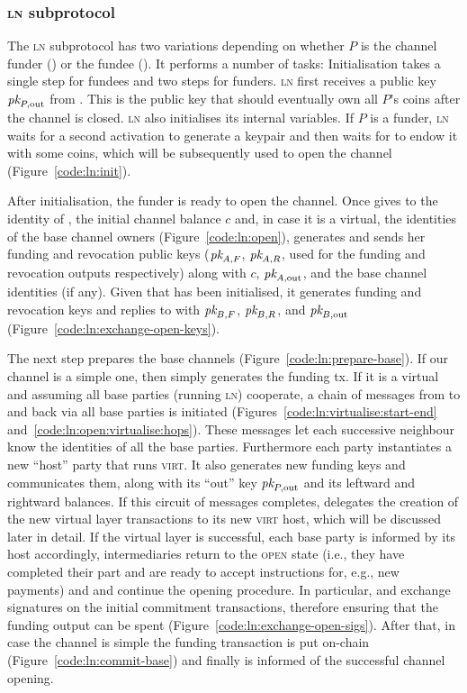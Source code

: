   \subsubsection{\textsc{ln} subprotocol}
  \label{construction:ln}
  The \textsc{ln} subprotocol has two variations depending on whether $P$ is the
  channel funder (\alice) or the fundee (\bob). It performs a number of tasks:
  Initialisation takes a single step for fundees and two steps for funders.
  \textsc{ln} first receives a public key $\textit{pk}_{P, \mathrm{out}}$ from
  \environment. This is the public key that should eventually own all $P$'s
  coins after the channel is closed. \textsc{ln} also initialises its internal
  variables. If $P$ is a funder, \textsc{ln} waits for a second activation to
  generate a keypair and then waits for \environment to endow it with some
  coins, which will be subsequently used to open the channel
  (Figure~\ref{code:ln:init}).

  After initialisation, the funder \alice is ready to open the channel. Once
  \environment gives to \alice the identity of \bob, the initial channel balance
  $c$ and,
  in case it is a virtual, the identities of the base channel owners
  (Figure~\ref{code:ln:open}), \alice generates and sends \bob her funding and
  revocation public keys ($\textit{pk}_{A, F}$, $\textit{pk}_{A, R}$, used for the funding and
  revocation outputs respectively) along with $c$, $\textit{pk}_{A,
  \mathrm{out}}$, and the base channel identities (if any). Given that \bob has
  been initialised, it generates funding and revocation keys and replies to
  \alice with $\textit{pk}_{B, F}$, $\textit{pk}_{B, R}$, and $\textit{pk}_{B, \mathrm{out}}$
  (Figure~\ref{code:ln:exchange-open-keys}).

  The next step prepares the base channels (Figure~\ref{code:ln:prepare-base}).
  If our channel is a simple one, then \alice simply generates the funding tx.
  If it is a virtual and assuming all base parties (running \textsc{ln})
  cooperate, a chain of messages from \alice to \bob and back via all base
  parties is initiated (Figures~\ref{code:ln:virtualise:start-end}
  and~\ref{code:ln:open:virtualise:hops}). These messages let each successive
  neighbour know the identities of all the base parties. Furthermore each party
  instantiates a new ``host'' party that runs \textsc{virt}. It also generates
  new funding keys and communicates them, along with its ``out'' key $\textit{pk}_{P,
  \mathrm{out}}$ and its
  leftward and rightward balances. If this circuit of messages completes, \alice
  delegates the creation of the new virtual layer transactions to its new
  \textsc{virt} host, which will be discussed later in detail. If the virtual
  layer is successful, each base party is informed by its host accordingly,
  intermediaries return to the \textsc{open} state (i.e., they have completed
  their part and are ready to accept instructions for, e.g., new payments) and \alice and
  \bob continue
  the opening procedure. In particular, \alice and \bob exchange signatures on
  the initial commitment transactions, therefore ensuring that the funding
  output can be spent (Figure~\ref{code:ln:exchange-open-sigs}). After that, in
  case the channel is simple the funding transaction is put on-chain
  (Figure~\ref{code:ln:commit-base}) and finally \environment is informed of the
  successful channel opening.

